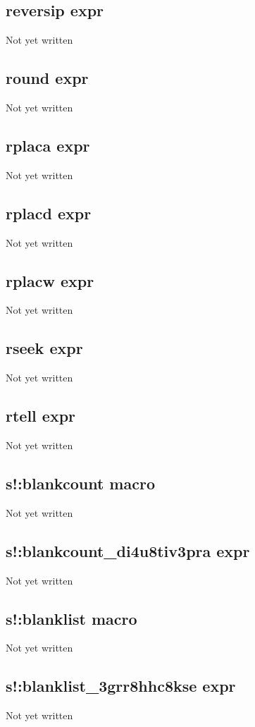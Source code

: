 \documentclass[a4paper,11pt]{article}
\begin{document}
\subsection{\ttfamily reversip expr}
Not yet written

\subsection{\ttfamily round expr}
Not yet written

\subsection{\ttfamily rplaca expr}
Not yet written

\subsection{\ttfamily rplacd expr}
Not yet written

\subsection{\ttfamily rplacw expr}
Not yet written

\subsection{\ttfamily rseek expr}
Not yet written

\subsection{\ttfamily rtell expr}
Not yet written

\subsection{\ttfamily s!:blankcount macro}
Not yet written

\subsection{\ttfamily s!:blankcount\_di4u8tiv3pra expr}
Not yet written

\subsection{\ttfamily s!:blanklist macro}
Not yet written

\subsection{\ttfamily s!:blanklist\_3grr8hhc8kse expr}
Not yet written
\end{document}
